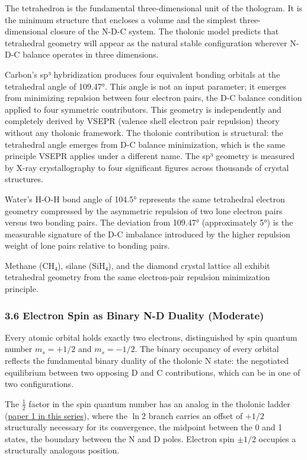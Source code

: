 \documentclass[
  11pt,
  letterpaper,
]{article}
\begin{document}
The tetrahedron is the fundamental three-dimensional unit of the
thologram. It is the minimum structure that encloses a volume and the
simplest three-dimensional closure of the N-D-C system. The tholonic
model predicts that tetrahedral geometry will appear as the natural
stable configuration wherever N-D-C balance operates in three
dimensions.

Carbon's sp³ hybridization produces four equivalent bonding orbitals at
the tetrahedral angle of 109.47°. This angle is not an input parameter;
it emerges from minimizing repulsion between four electron pairs, the
D-C balance condition applied to four symmetric contributors. This
geometry is independently and completely derived by VSEPR (valence shell
electron pair repulsion) theory without any tholonic framework. The
tholonic contribution is structural: the tetrahedral angle emerges from
D-C balance minimization, which is the same principle VSEPR applies
under a different name. The sp³ geometry is measured by X-ray
crystallography to four significant figures across thousands of crystal
structures.

Water's H-O-H bond angle of 104.5° represents the same tetrahedral
electron geometry compressed by the asymmetric repulsion of two lone
electron pairs versus two bonding pairs. The deviation from 109.47°
(approximately 5°) is the measurable signature of the D-C imbalance
introduced by the higher repulsion weight of lone pairs relative to
bonding pairs.

Methane (CH₄), silane (SiH₄), and the diamond crystal lattice all
exhibit tetrahedral geometry from the same electron-pair repulsion
minimization principle.

\subsubsection{3.6 Electron Spin as Binary N-D Duality
(Moderate)}\label{electron-spin-as-binary-n-d-duality-moderate}

Every atomic orbital holds exactly two electrons, distinguished by spin
quantum number \(m_s = +1/2\) and \(m_s = -1/2\). The binary occupancy
of every orbital reflects the fundamental binary duality of the tholonic
N state: the negotiated equilibrium between two opposing D and C
contributions, which can be in one of two configurations.

The \(\tfrac{1}{2}\) factor in the spin quantum number has an analog in
the tholonic ladder
(\href{https://github.com/baardev/truevalue/blob/main/docnav/Research/papers/1_recursive-tholonic-five-constants/1_recursive-tholonic-five-constants.pdf}{paper
1 in this series}), where the \(\ln 2\) branch carries an offset of
\(+1/2\) structurally necessary for its convergence, the midpoint
between the 0 and 1 states, the boundary between the N and D poles.
Electron spin \(\pm 1/2\) occupies a structurally analogous position.
\end{document}
